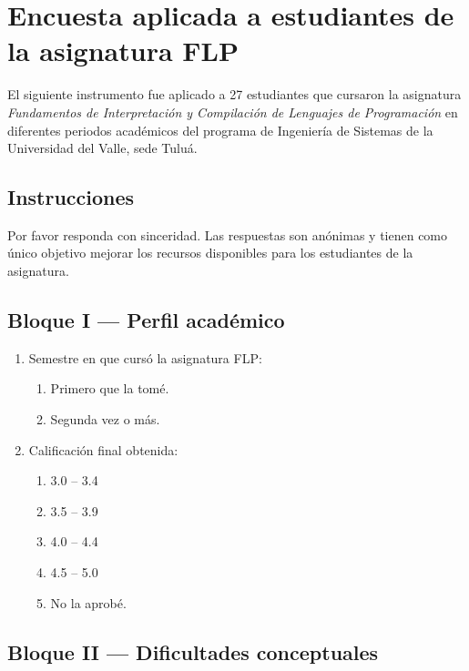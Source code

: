 \chapter{Encuesta aplicada a estudiantes de la asignatura FLP}
\label{annex:encuesta-estudiantes}

El siguiente instrumento fue aplicado a 27 estudiantes que cursaron la asignatura \textit{Fundamentos de Interpretación y Compilación de Lenguajes de Programación} en diferentes periodos académicos del programa de Ingeniería de Sistemas de la Universidad del Valle, sede Tuluá.

\section*{Instrucciones}

Por favor responda con sinceridad. Las respuestas son anónimas y tienen como único objetivo mejorar los recursos disponibles para los estudiantes de la asignatura.

\section*{Bloque I — Perfil académico}

\begin{enumerate}
    \item Semestre en que cursó la asignatura FLP:
    \begin{enumerate}
        \item Primero que la tomé.
        \item Segunda vez o más.
    \end{enumerate}

    \item Calificación final obtenida:
    \begin{enumerate}
        \item 3.0 – 3.4
        \item 3.5 – 3.9
        \item 4.0 – 4.4
        \item 4.5 – 5.0
        \item No la aprobé.
    \end{enumerate}
\end{enumerate}

\section*{Bloque II — Dificultades conceptuales}

